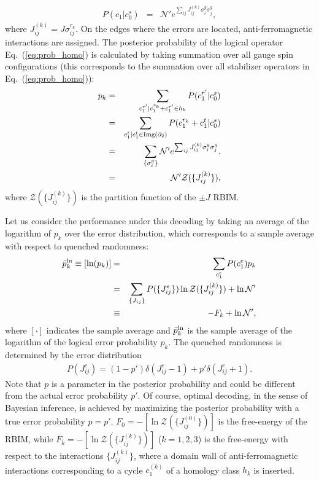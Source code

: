 \begin{eqnarray}
P( c_1  | c_0^{s}) &=&\mathcal{N}' e ^{ \sum _{ij} J_{ij}^{(k)}\sigma^g _{i}\sigma^g _{j}},
\end{eqnarray}
where $J_{ij}^{(k)} = J\sigma _{ij}^{r_k}$.
On the edges where the errors are located, anti-ferromagnetic interactions are assigned.
The posterior probability of the logical operator Eq.\ (\ref{eq:prob_homo}) is calculated by taking summation over all gauge spin configurations (this corresponds to the summation over all stabilizer operators in Eq.\ (\ref{eq:prob_homo})):
\begin{eqnarray}
p_{k}&=& \sum _{c_1^{r'}| c_1^{r_k}+c_1^{r'} \in h_k} P( c_1^{r'}  | c_0^{s})
\\
&=& \sum _{c_1^{t} |  c_1^{t} \in {\rm Img}(\partial _2)} P( c_1^{r_k}+ c_1^{t}  | c_0^{s})
\\
&=&
\sum _{\{ \sigma _i^{g}\}} \mathcal{N}' e ^{ \sum _{ij} J_{ij}^{(k)}\sigma^g _{i}\sigma^g _{j}}.
\\
&=& \mathcal{N}' \mathcal{Z}(\{ J_{ij}^{(k)}\}),
\label{eq:logi_prob1}
\end{eqnarray}
where $\mathcal{Z}(\{ J_{ij}^{(k)}\})$ is the partition function of the $\pm J$ RBIM.

Let us consider the performance under this decoding by taking an average of the logarithm of $p_k$ over the error distribution, which corresponds to a sample average with respect to quenched randomness:
\begin{eqnarray}
\bar p^{\rm ln}_k \equiv [\ln (p_k)] &=& \sum _{c_1^{e}} P(c_1^{e}) p_k
\\
&=&
\sum _{\{ J_{ij}\}} P(\{ J_{ij}^{e} \}) \ln \mathcal{Z}(\{ J_{ij}^{(k)}\}) +\ln \mathcal{N}'
\\
&\equiv & -F_k + \ln \mathcal{N}', 
\label{eq:sample_ave}
\end{eqnarray}
where $[\cdot]$ indicates the sample average and $\bar p^{\rm ln}_k$ is the sample average of the logarithm of the logical error probability $p_k$.
The quenched randomness is determined by the error distribution
\begin{eqnarray}
P( J_{ij}^{e} ) =(1-p') \delta ( J_{ ij}^{e} -1 )+ p'\delta ( J_{ i  j}^{e} +1 ).
\end{eqnarray}
Note that $p$ is a parameter in the posterior probability and could be different from the actual error probability $p'$.
Of course, optimal decoding,
in the sense of Bayesian inference, is achieved by maximizing the posterior probability with a true error probability $p=p'$.
$F_0=-[\ln \mathcal{Z}(\{ J_{ij}^{(0)}\})]$ is the free-energy of the RBIM, while $F_k =-[\ln \mathcal{Z}(\{ J_{ij}^{(k)}\})]$ ($k=1,2,3$) is the free-energy with respect to the interactions $\{ J_{ij}^{(k)}\}$, where a domain wall of anti-ferromagnetic interactions corresponding to a cycle $c_1^{(k)}$ of a homology class $h_k$ is inserted.

